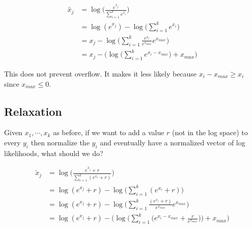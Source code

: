 \documentclass[11pt]{article}
\theoremstyle{definition}
\begin{document}
\begin{align}
  \tilde{x_j} &= \log\Big(\frac{e^{x_j}}{\sum_{i=1}^ke^{x_i}}\Big)\\
  &= \log(e^{x_j})-\log\Big(\sum_{i=1}^ke^{x_i}\Big)\\
  &= x_j-\log\Big(\sum_{i=1}^k\frac{e^{x_i}}{e^{x_{max}}}e^{x_{max}}\Big)\\
  &= x_j-\Bigg(\log\Big(\sum_{i=1}^ke^{x_i-x_{max}}\Big)+x_{max}\Bigg)
\end{align}

This does not prevent overflow. It makes it less likely because $x_i-x_{max} \geq x_i$ since $x_{max}\leq 0$.

\subsection{Relaxation}

Given $x_1,\cdots,x_k$ as before, if we want to add a value $r$ (not in the log space) to every $y_i$ then normalize the $y_i$ and eventually have a normalized vector of log likelihoods, what should we do?

\begin{align}
  \tilde{x}_j&=\log\Big(\frac{e^{x_j}+r}{\sum_{i=1}^k(e^{x_i}+r)}\Big)\\
  &=\log(e^{x_j}+r)-\log\Big({\sum_{i=1}^k(e^{x_i}+r)}\Big)\\
  &=\log(e^{x_j}+r)-\log\Big({\sum_{i=1}^k\frac{(e^{x_i}+r)}{e^{x_{max}}}{e^{x_{max}}}}\Big)\\
&=\log(e^{x_j}+r)-\Bigg(\log\Big({\sum_{i=1}^k\Big(e^{x_i-x_{max}}+\frac{r}{e^{x_{max}}}\Big)}\Big)+x_{max}\Bigg)
\end{align}
\end{document}
